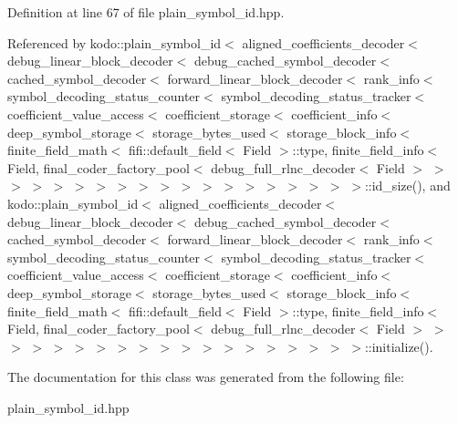 Definition at line 67 of file plain\-\_\-symbol\-\_\-id.\-hpp.



Referenced by kodo\-::plain\-\_\-symbol\-\_\-id$<$ aligned\-\_\-coefficients\-\_\-decoder$<$ debug\-\_\-linear\-\_\-block\-\_\-decoder$<$ debug\-\_\-cached\-\_\-symbol\-\_\-decoder$<$ cached\-\_\-symbol\-\_\-decoder$<$ forward\-\_\-linear\-\_\-block\-\_\-decoder$<$ rank\-\_\-info$<$ symbol\-\_\-decoding\-\_\-status\-\_\-counter$<$ symbol\-\_\-decoding\-\_\-status\-\_\-tracker$<$ coefficient\-\_\-value\-\_\-access$<$ coefficient\-\_\-storage$<$ coefficient\-\_\-info$<$ deep\-\_\-symbol\-\_\-storage$<$ storage\-\_\-bytes\-\_\-used$<$ storage\-\_\-block\-\_\-info$<$ finite\-\_\-field\-\_\-math$<$ fifi\-::default\-\_\-field$<$ Field $>$\-::type, finite\-\_\-field\-\_\-info$<$ Field, final\-\_\-coder\-\_\-factory\-\_\-pool$<$ debug\-\_\-full\-\_\-rlnc\-\_\-decoder$<$ Field $>$ $>$ $>$ $>$ $>$ $>$ $>$ $>$ $>$ $>$ $>$ $>$ $>$ $>$ $>$ $>$ $>$ $>$ $>$\-::id\-\_\-size(), and kodo\-::plain\-\_\-symbol\-\_\-id$<$ aligned\-\_\-coefficients\-\_\-decoder$<$ debug\-\_\-linear\-\_\-block\-\_\-decoder$<$ debug\-\_\-cached\-\_\-symbol\-\_\-decoder$<$ cached\-\_\-symbol\-\_\-decoder$<$ forward\-\_\-linear\-\_\-block\-\_\-decoder$<$ rank\-\_\-info$<$ symbol\-\_\-decoding\-\_\-status\-\_\-counter$<$ symbol\-\_\-decoding\-\_\-status\-\_\-tracker$<$ coefficient\-\_\-value\-\_\-access$<$ coefficient\-\_\-storage$<$ coefficient\-\_\-info$<$ deep\-\_\-symbol\-\_\-storage$<$ storage\-\_\-bytes\-\_\-used$<$ storage\-\_\-block\-\_\-info$<$ finite\-\_\-field\-\_\-math$<$ fifi\-::default\-\_\-field$<$ Field $>$\-::type, finite\-\_\-field\-\_\-info$<$ Field, final\-\_\-coder\-\_\-factory\-\_\-pool$<$ debug\-\_\-full\-\_\-rlnc\-\_\-decoder$<$ Field $>$ $>$ $>$ $>$ $>$ $>$ $>$ $>$ $>$ $>$ $>$ $>$ $>$ $>$ $>$ $>$ $>$ $>$ $>$\-::initialize().



The documentation for this class was generated from the following file\-:\begin{DoxyCompactItemize}
\item 
plain\-\_\-symbol\-\_\-id.\-hpp\end{DoxyCompactItemize}
